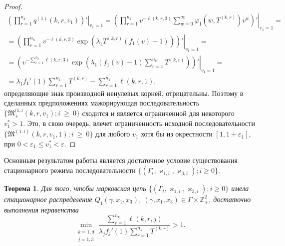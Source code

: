 \documentclass[a4paper,twoside]{article}
\theoremstyle{theorem}
\newtheorem{theorem}{Теорема}
\theoremstyle{remark}
\begin{document}
\begin{proof}
\begin{multline}
 \left.\left(\prod_{r=1}^{n_k}q^{(1)}(k,r,v_1)\right) ' \right|_{v_1=1} = 
  \left.\left(\prod_{r=1}^{n_k}v^{-\ell(k,r,3)}\sum_{w=0}^{\infty} \varphi_1(w,T^{(k,r)})v^w \right) ' \right|_{v_1=1} = \\ =
   \left.\left(\prod_{r=1}^{n_k} v^{-\ell(k,r,3)}\exp(\lambda_1 T^{(k,r)} (f_1(v)-1))\right) ' \right|_{v_1=1} = \\ =
    \left.\left(v^{-\sum_{r=1}^{n_k}\ell(k,r,3)}\exp(\lambda_1 (f_1(v)-1)\sum_{r=1}^{n_k} T^{(k,r)}) \right) ' \right|_{v_1=1} = \\ =
\lambda_1 f_1'(1) \sum_{r=1}^{n_k} T^{(k,r)} -\sum_{r=1}^{n_k} \ell(k,r,1), 
\label{derivative:cycle}
\end{multline}
определяющие знак производной ненулевых корней, отрицательны. Поэтому 
в сделанных предположениях мажорирующая последовательность  $\{\mathfrak{M}_+^{(1,i}(k,r,v_1); {i~\geqslant~0}\}$ сходится и является ограниченной для некоторого ${v_1^*>1}$. Это, в свою очередь, влечет ограниченность исходной последовательности \linebreak $\{\mathfrak{M}^{(1,i)}(k,r,v_1,1); i~\geqslant~0\}$ для любого $v_1$ хотя бы из окрестности $[1, 1+\varepsilon_1]$, при ${0<\varepsilon_1 \leqslant v_1^* < \varepsilon}$.
\end{proof}
Основным результатом работы является достаточное условие существования стационарного режима последовательности $\{(\Gamma_i, \varkappa_{1,i},\varkappa_{3,i}); i \geqslant 0\}$.
\begin{theorem}
Для того, чтобы марковская цепь $\{(\Gamma_i, \varkappa_{1,i},\varkappa_{3,i}); i \geqslant 0\}$ имела стационарное распределение $Q_1(\gamma,x_1,x_3)$, $(\gamma,x_1,x_3)\in \Gamma \times {\mathbb Z}^2_+$, достаточно выполнения неравенства 
\begin{equation}
\min_{\substack{k=\overline{1,d}\\ j=1,3}} { \frac{\sum_{r = 1}^{n_k} \ell(k,r,j) }{\lambda_j f_j'(1) \sum_{r=1}^{n_k} T^{(k,r)} }}>1.
\label{sufficient:double}
\end{equation}
\end{theorem}
\end{document}
